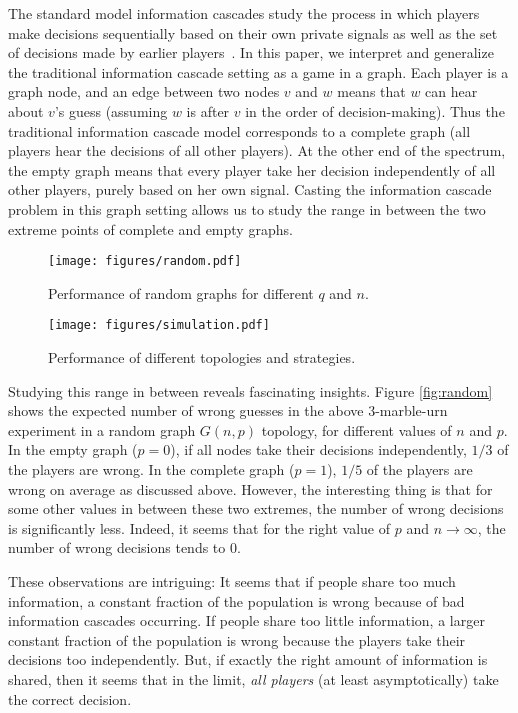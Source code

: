 \documentclass[a4paper,UKenglish]{lipics}
\theoremstyle{definition}
\begin{document}
The standard model information cascades study the process in which 
	players make decisions sequentially based on their own private signals 
	as well as the set of decisions made by earlier players~\cite{banerjee1992simple, bikhchandani1992theory, welch1992sequential}. 
In this paper, we interpret and generalize the traditional information cascade setting as a game in a graph. 
Each player is a graph node, 
	and an edge between two nodes $v$ and $w$ means that $w$ can hear about $v$'s guess 
	(assuming $w$ is after $v$ in the order of decision-making). 
Thus the traditional information cascade model corresponds to a complete graph 
	(all players hear the decisions of all other players). 
At the other end of the spectrum, 
	the empty graph means that every player take her decision independently of all other players, 
	purely based on her own signal.
Casting the information cascade problem in this graph setting 
	allows us to study the range in between the two extreme points of complete and empty graphs. 

\begin{figure}
	\begin{minipage}{2in}
    		\texttt{[image: figures/random.pdf]}
		\caption{Performance of random graphs for different $q$ and $n$.}
		\label{fig:random}
	\end{minipage}
	\hspace{1in}
	\begin{minipage}{2in}
		\texttt{[image: figures/simulation.pdf]}
		\caption{Performance of different topologies and strategies.}
		\label{fig:simulation}
	\end{minipage}
\end{figure}

Studying this range in between reveals fascinating insights. 
Figure \ref{fig:random} shows the expected number of wrong guesses 
	in the above 3-marble-urn experiment in a random graph $G(n,p)$ topology, 
	for different values of $n$ and $p$. 
In the empty graph ($p=0$), if all nodes take their decisions independently, $1/3$ of the players are wrong. 
In the complete graph ($p=1$), $1/5$ of the players are wrong on average as discussed above. 
However, the interesting thing is that for some other values in between these two extremes,
	the number of wrong decisions is significantly less. 
Indeed, it seems that for the right value of $p$ and $n\rightarrow\infty$, the number of wrong decisions tends to $0$. 

These observations are intriguing: 
	It seems that if people share too much information, 
	a constant fraction of the population is wrong because of bad information cascades occurring. 
If people share too little information, 
	a larger constant fraction of the population is wrong because the players take their decisions too independently. 
But, if exactly the right amount of information is shared, 
	then it seems that in the limit, \emph{all players} (at least asymptotically) take the correct decision. 
\end{document}
